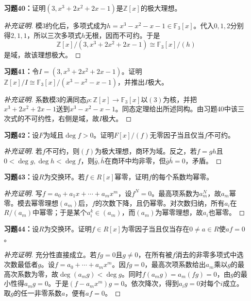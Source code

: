 \begin{problem}
\textbf{习题40：}证明$(3,x^3+2x^2+2x-1)$是$\mathbb Z[x]$的极大理想。
\end{problem}
\begin{proof}[补充证明]
模$3$约化后，多项式成为$h=x^3-x^2-x-1\in\mathbb F_3[x]$。代入$0,1,2$分别得$2,1,1$，所以三次多项式$h$无根，因而不可约。于是
\[
\mathbb Z[x]/(3,x^3+2x^2+2x-1)\cong\mathbb F_3[x]/(h)
\]
是域，故该理想极大。
\end{proof}

\begin{problem}
\textbf{习题41：}令$I=(3,x^3+2x^2+2x-1)$。证明$\mathbb Z[x]/I\cong\mathbb F_3[x]/(x^3-x^2-x-1)$，并推出$I$极大。
\end{problem}
\begin{proof}[补充证明]
系数模$3$的满同态$\rho:\mathbb Z[x]\to\mathbb F_3[x]$以$(3)$为核，并把$x^3+2x^2+2x-1$送到$x^3-x^2-x-1$。同态定理给出所述同构。由习题40中该三次式的不可约性，右侧是域，故$I$极大。
\end{proof}

\begin{problem}
\textbf{习题42：}设$F$为域且$\deg f>0$。证明$F[x]/(f)$无零因子当且仅当$f$不可约。
\end{problem}
\begin{proof}[补充证明]
若$f$不可约，则$(f)$为极大理想，商环为域。反之，若$f=gh$且$0<\deg g,\deg h<\deg f$，则$\bar g,\bar h$在商环中均非零，但$\bar g\bar h=0$，矛盾。
\end{proof}

\begin{problem}
\textbf{习题43：}设$R$为交换环。若$f\in R[x]$幂零，证明$f$的每个系数均幂零。
\end{problem}
\begin{proof}[补充证明]
写$f=a_0+a_1x+\cdots+a_mx^m$，设$f^N=0$。最高项系数为$a_m^N$，故$a_m$幂零。模去幂零理想$(a_m)$后，$f$的次数下降，且仍幂零。对次数归纳，所有$a_i$在$R/(a_m)$中幂零；于是某个$a_i^k\in(a_m)$，而$(a_m)$为幂零理想，故$a_i$也幂零。
\end{proof}

\begin{problem}
\textbf{习题44：}设$R$为交换环。证明$f\in R[x]$为零因子当且仅当存在$0\ne a\in R$使$af=0$。
\end{problem}
\begin{proof}[补充证明]
充分性直接成立。若$fg=0$且$g\ne0$，在所有被$f$消去的非零多项式中选次数最低者$g$。设$f=a_0+\cdots+a_mx^m$。因$fg=0$，最高次项系数给出$a_m$乘以$g$的最高次系数为零，故$\deg(a_mg)<\deg g$。同时$f(a_mg)=a_m(fg)=0$，由$g$的最小性得$a_mg=0$。于是$(f-a_mx^m)g=0$。依次降次，得到$a_ig=0$对每个$i$成立。取$g$的任一非零系数$a$，便有$af=0$。
\end{proof}

